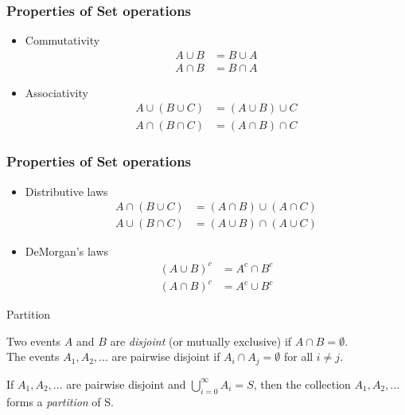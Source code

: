 \documentclass{beamer}
\begin{document}
\begin{frame}
        \frametitle{Properties of Set operations}

	\begin{itemize}
		\item Commutativity
		\begin{align*}
			A \cup B &= B \cup A \\ 
			A \cap B &= B \cap A
		\end{align*}
		\item Associativity
		\begin{align*}
			A \cup (B \cup C) &= (A \cup B) \cup C \\
			A \cap (B \cap C) &= (A \cap B) \cap C
		\end{align*}
	\end{itemize}

\end{frame}

\begin{frame}
        \frametitle{Properties of Set operations}

        \begin{itemize}
		\item Distributive laws
		\begin{align*}
			A \cap (B \cup C) &= (A \cap B) \cup (A \cap C) \\
			A \cup (B \cap C) &= (A \cup B) \cap (A \cup C)
		\end{align*}
		\item DeMorgan's laws
		\begin{align*}
			(A \cup B)^c &= A^c \cap B^c \\
			(A \cap B)^c &= A^c \cup B^c
		\end{align*}
	\end{itemize}

\end{frame}

\begin{frame}{Partition}

	\begin{block}{}
		Two events $A$ and $B$ are \textit{disjoint} (or mutually exclusive) if $A \cap B = \emptyset$.\\ 
		The events $A_1,A_2,...$ are pairwise disjoint if $A_i \cap A_j = \emptyset$ for all $i \neq j$.
	\end{block}

	\begin{block}{}
		If $A_1, A_2, ...$ are pairwise disjoint and $\bigcup_{i=0}^\infty A_i = S$, then the 
		collection $A_1, A_2, ...$ forms a \textit{partition} of S.
	\end{block}

\end{frame}
\end{document}
